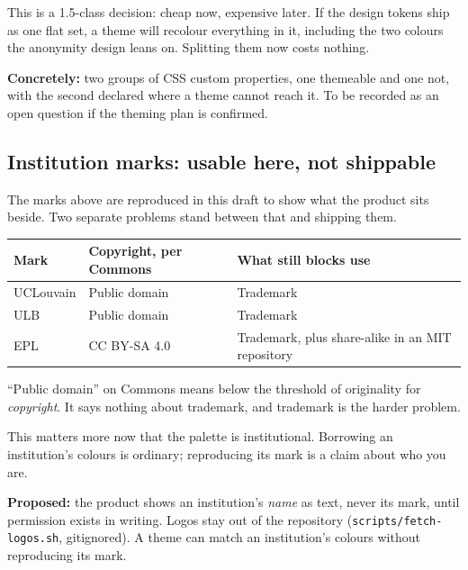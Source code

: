\documentclass[11pt,a4paper]{article}
\begin{document}
\begin{why}
This is a 1.5-class decision: cheap now, expensive later. If the design tokens
ship as one flat set, a theme will recolour everything in it, including the two
colours the anonymity design leans on. Splitting them now costs nothing.

\textbf{Concretely:} two groups of CSS custom properties, one themeable and one
not, with the second declared where a theme cannot reach it. To be recorded as
an open question if the theming plan is confirmed.
\end{why}

\subsection{Institution marks: usable here, not shippable}

The marks above are reproduced in this draft to show what the product sits
beside. Two separate problems stand between that and shipping them.

\begin{center}
\sffamily\small
\begin{tabular}{@{}p{4.2cm}p{4.0cm}p{5.6cm}@{}}
\toprule
\textbf{Mark} & \textbf{Copyright, per Commons} & \textbf{What still blocks use} \\
\midrule
UCLouvain & Public domain & Trademark \\
ULB & Public domain & Trademark \\
EPL & CC BY-SA 4.0 & Trademark, plus share-alike in an MIT repository \\
\bottomrule
\end{tabular}
\end{center}

``Public domain'' on Commons means below the threshold of originality for
\emph{copyright}. It says nothing about trademark, and trademark is the harder
problem.

This matters more now that the palette is institutional. Borrowing an
institution's colours is ordinary; reproducing its mark is a claim about who
you are.

\begin{openq}
\textbf{Proposed:} the product shows an institution's \emph{name} as text, never
its mark, until permission exists in writing. Logos stay out of the repository
(\texttt{scripts/fetch-logos.sh}, gitignored). A theme can match an
institution's colours without reproducing its mark.
\end{openq}
\end{document}
